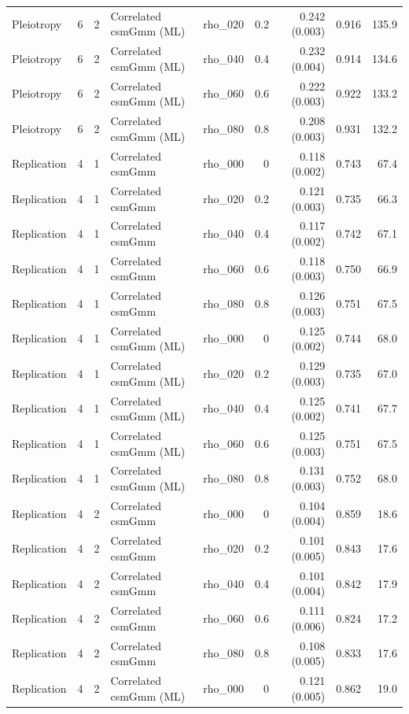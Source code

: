\begin{longtable}{lcclrrrrr}
Pleiotropy & 6 & 2 & Correlated csmGmm (ML) & rho\_020 & 0.2 & 0.242 (0.003) & 0.916 & 135.9\\
Pleiotropy & 6 & 2 & Correlated csmGmm (ML) & rho\_040 & 0.4 & 0.232 (0.004) & 0.914 & 134.6\\
Pleiotropy & 6 & 2 & Correlated csmGmm (ML) & rho\_060 & 0.6 & 0.222 (0.003) & 0.922 & 133.2\\
Pleiotropy & 6 & 2 & Correlated csmGmm (ML) & rho\_080 & 0.8 & 0.208 (0.003) & 0.931 & 132.2\\
Replication & 4 & 1 & Correlated csmGmm & rho\_000 & 0 & 0.118 (0.002) & 0.743 & 67.4\\
Replication & 4 & 1 & Correlated csmGmm & rho\_020 & 0.2 & 0.121 (0.003) & 0.735 & 66.3\\
Replication & 4 & 1 & Correlated csmGmm & rho\_040 & 0.4 & 0.117 (0.002) & 0.742 & 67.1\\
Replication & 4 & 1 & Correlated csmGmm & rho\_060 & 0.6 & 0.118 (0.003) & 0.750 & 66.9\\
Replication & 4 & 1 & Correlated csmGmm & rho\_080 & 0.8 & 0.126 (0.003) & 0.751 & 67.5\\
Replication & 4 & 1 & Correlated csmGmm (ML) & rho\_000 & 0 & 0.125 (0.002) & 0.744 & 68.0\\
Replication & 4 & 1 & Correlated csmGmm (ML) & rho\_020 & 0.2 & 0.129 (0.003) & 0.735 & 67.0\\
Replication & 4 & 1 & Correlated csmGmm (ML) & rho\_040 & 0.4 & 0.125 (0.002) & 0.741 & 67.7\\
Replication & 4 & 1 & Correlated csmGmm (ML) & rho\_060 & 0.6 & 0.125 (0.003) & 0.751 & 67.5\\
Replication & 4 & 1 & Correlated csmGmm (ML) & rho\_080 & 0.8 & 0.131 (0.003) & 0.752 & 68.0\\
Replication & 4 & 2 & Correlated csmGmm & rho\_000 & 0 & 0.104 (0.004) & 0.859 & 18.6\\
Replication & 4 & 2 & Correlated csmGmm & rho\_020 & 0.2 & 0.101 (0.005) & 0.843 & 17.6\\
Replication & 4 & 2 & Correlated csmGmm & rho\_040 & 0.4 & 0.101 (0.004) & 0.842 & 17.9\\
Replication & 4 & 2 & Correlated csmGmm & rho\_060 & 0.6 & 0.111 (0.006) & 0.824 & 17.2\\
Replication & 4 & 2 & Correlated csmGmm & rho\_080 & 0.8 & 0.108 (0.005) & 0.833 & 17.6\\
Replication & 4 & 2 & Correlated csmGmm (ML) & rho\_000 & 0 & 0.121 (0.005) & 0.862 & 19.0\\

\end{longtable}
